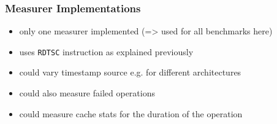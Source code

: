 \subsubsection{Measurer Implementations}
\begin{itemize}
    \item only one measurer implemented (=> used for all benchmarks here)
    \item uses \texttt{RDTSC} instruction as explained previously
    \item could vary timestamp source e.g. for different architectures
    \item could also measure failed operations
    \item could measure cache stats for the duration of the operation
\end{itemize}
